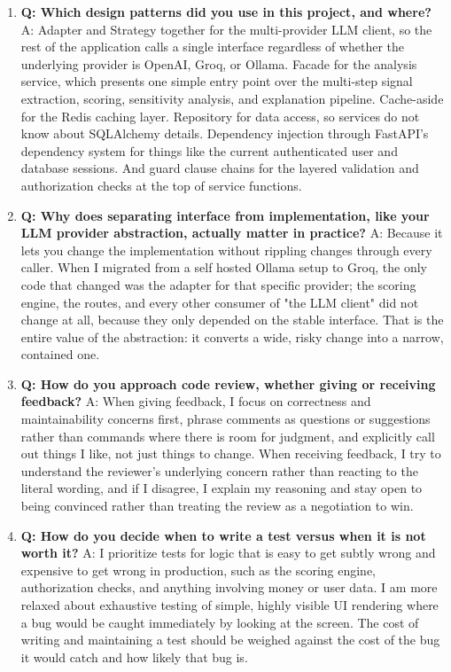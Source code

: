 \documentclass[11pt,a4paper]{report}
\begin{document}
\begin{enumerate}[leftmargin=*]
\item \textbf{Q: Which design patterns did you use in this project, and where?}
A: Adapter and Strategy together for the multi-provider LLM client, so the rest of the application calls a single interface regardless of whether the underlying provider is OpenAI, Groq, or Ollama. Facade for the analysis service, which presents one simple entry point over the multi-step signal extraction, scoring, sensitivity analysis, and explanation pipeline. Cache-aside for the Redis caching layer. Repository for data access, so services do not know about SQLAlchemy details. Dependency injection through FastAPI's dependency system for things like the current authenticated user and database sessions. And guard clause chains for the layered validation and authorization checks at the top of service functions.

\item \textbf{Q: Why does separating interface from implementation, like your LLM provider abstraction, actually matter in practice?}
A: Because it lets you change the implementation without rippling changes through every caller. When I migrated from a self hosted Ollama setup to Groq, the only code that changed was the adapter for that specific provider; the scoring engine, the routes, and every other consumer of "the LLM client" did not change at all, because they only depended on the stable interface. That is the entire value of the abstraction: it converts a wide, risky change into a narrow, contained one.

\item \textbf{Q: How do you approach code review, whether giving or receiving feedback?}
A: When giving feedback, I focus on correctness and maintainability concerns first, phrase comments as questions or suggestions rather than commands where there is room for judgment, and explicitly call out things I like, not just things to change. When receiving feedback, I try to understand the reviewer's underlying concern rather than reacting to the literal wording, and if I disagree, I explain my reasoning and stay open to being convinced rather than treating the review as a negotiation to win.

\item \textbf{Q: How do you decide when to write a test versus when it is not worth it?}
A: I prioritize tests for logic that is easy to get subtly wrong and expensive to get wrong in production, such as the scoring engine, authorization checks, and anything involving money or user data. I am more relaxed about exhaustive testing of simple, highly visible UI rendering where a bug would be caught immediately by looking at the screen. The cost of writing and maintaining a test should be weighed against the cost of the bug it would catch and how likely that bug is.


\end{enumerate}
\end{document}
